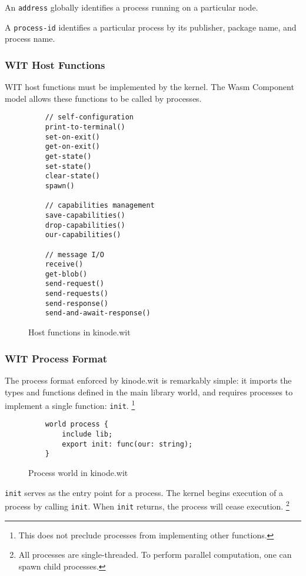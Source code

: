 \documentclass[runningheads]{llncs}
\begin{document}
An \verb|address| globally identifies a process running on a particular node.

A \verb|process-id| identifies a particular process by its publisher, package name, and process name.

\subsubsection{WIT Host Functions}
\label{sec:oswitfuncs}

WIT host functions must be implemented by the kernel.
The Wasm Component model allows these functions to be called by processes.

\begin{figure}[H]
    \centering
    \begin{verbatim}
    // self-configuration
    print-to-terminal()
    set-on-exit()
    get-on-exit()
    get-state()
    set-state()
    clear-state()
    spawn()

    // capabilities management
    save-capabilities()
    drop-capabilities()
    our-capabilities()

    // message I/O
    receive()
    get-blob()
    send-request()
    send-requests()
    send-response()
    send-and-await-response()
    \end{verbatim}
    \caption{Host functions in kinode.wit}
    \label{fig:WIT Functions}
\end{figure}

\subsubsection{WIT Process Format}
\label{sec:oswitprocess}

The process format enforced by kinode.wit is remarkably simple: it imports the types and functions defined in the main library world, and requires processes to implement a single function: \verb|init|.
\footnote{This does not preclude processes from implementing other functions.}

\begin{figure}[H]
    \centering
    \begin{verbatim}
    world process {
        include lib;
        export init: func(our: string);
    }
    \end{verbatim}
    \caption{Process world in kinode.wit}
    \label{fig:Process world}
\end{figure}

\verb|init| serves as the entry point for a process.
The kernel begins execution of a process by calling \verb|init|.
When \verb|init| returns, the process will cease execution.
\footnote{All processes are single-threaded. To perform parallel computation, one can spawn child processes.}
\end{document}
